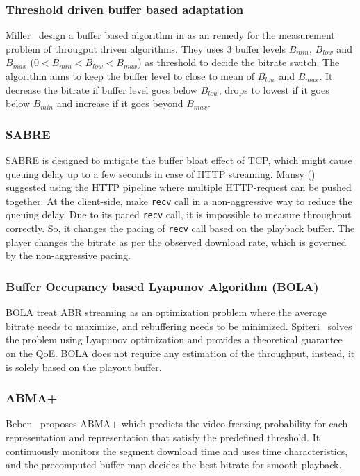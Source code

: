 \subsubsection{Threshold driven buffer based adaptation}
Miller \etal\ design a buffer based algorithm in \cite{6229732} as an remedy for the measurement problem of througput driven algorithms. They uses 3 buffer levels $B_{min}$, $B_{low}$ and $B_{max}$ ($0 < B_{min} < B_{low} < B_{max}$) as threshold to decide the bitrate switch. The algorithm aims to keep the buffer level to close to mean of $B_{low}$ and $B_{max}$. It decrease the bitrate if buffer level goes below $B_{low}$, drops to lowest if it goes below $B_{min}$ and increase if it goes beyond $B_{max}$.

\subsubsection{SABRE}
SABRE is designed to mitigate the buffer bloat effect of TCP, which might cause queuing delay up to a few seconds in case of HTTP streaming. Mansy \etal(\cite{10.1145/2483977.2484004}) suggested using the HTTP pipeline where multiple HTTP-request can be pushed together. At the client-side, make {\tt recv} call in a non-aggressive way to reduce the queuing delay. Due to its paced {\tt recv} call, it is impossible to measure throughput correctly. So, it changes the pacing of {\tt recv} call based on the playback buffer. The player changes the bitrate as per the observed download rate, which is governed by the non-aggressive pacing.

\subsubsection{Buffer Occupancy based Lyapunov Algorithm (BOLA)}
BOLA\cite{Spiteri2016} treat ABR streaming as an optimization problem where the average bitrate needs to maximize, and rebuffering needs to be minimized. Spiteri \etal\ solves the problem using Lyapunov optimization and provides a theoretical guarantee on the QoE. BOLA does not require any estimation of the throughput, instead, it is solely based on the playout buffer.

\subsubsection{ABMA+\cite{10.1145/2910017.2910596}}
Beben \etal\ proposes ABMA+\cite{10.1145/2910017.2910596} which predicts the video freezing probability for each representation and representation that satisfy the predefined threshold. It continuously monitors the segment download time and uses time characteristics, and the precomputed buffer-map decides the best bitrate for smooth playback.

